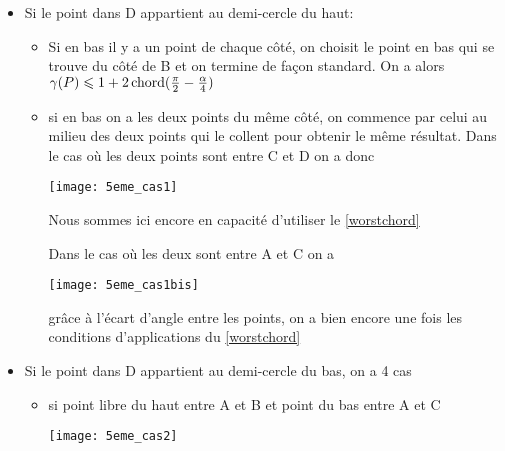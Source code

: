 \begin{itemize}

\item \label{5cas1} Si le point dans D appartient au demi-cercle du haut:

\begin{itemize}

\item \label{5cas11} Si en bas il y a un point de chaque côté, on choisit le point en bas qui se trouve du côté de B et on termine de façon standard. On a alors $\gamma(P) \leqslant 1 + 2\operatorname{chord}(\frac{\pi}{2} - \frac{\alpha}{4})$

\item \label{5cas12} si en bas on a les deux points du même côté, on commence par celui au milieu des deux points qui le collent pour obtenir le même résultat.
Dans le cas où les deux points sont entre C et D on a donc

  \texttt{[image: 5eme\_cas1]}

Nous sommes ici encore en capacité d'utiliser le \cref{worstchord}

\label{5cas13} Dans le cas où les deux sont entre A et C on a

  \texttt{[image: 5eme\_cas1bis]}

grâce à l'écart d'angle entre les points, on a bien encore une fois les
conditions d'applications du \cref{worstchord}

\end{itemize}

\item \label{5cas2} Si le point dans D appartient au demi-cercle du bas, on a 4 cas

\begin{itemize}

\item \label{5cas21} si point libre du haut entre A et B et point du bas entre A et C

  \texttt{[image: 5eme\_cas2]}


\end{itemize}
\end{itemize}

